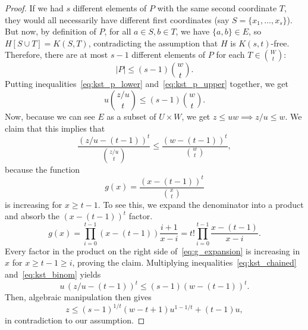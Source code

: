 \begin{theorem}
\begin{proof}
        If we had $s$ different elements of $P$ with the same second coordinate $T$,
        they would all necessarily have different first coordinates
        (say $S = \{x_1, \dots, x_s\}$).
        But now, by definition of $P$, for all $a \in S, b \in T$, we have $\{a, b\} \in E$,
        so $H[S \cup T] = K(S, T)$, contradicting the assumption that $H$ is $K(s, t)$-free.
        Therefore, there are at most $s - 1$ different elements of $P$ for each $T \in \binom{W}{t}$:
        \begin{equation} \label{eq:kst_p_upper}
            |P| \leq (s - 1) \binom{w}{t}.
        \end{equation}
        Putting inequalities~\eqref{eq:kst_p_lower} and~\eqref{eq:kst_p_upper}
        together, we get
        \begin{equation} \label{eq:kst_chained}
            u \binom{z / u}{t} \leq (s - 1) \binom{w}{t}.
        \end{equation}
        Now, because we can see $E$ as a subset of $U \times W$,
        we get $z \leq uw \implies z/u \leq w$.
        We claim that this implies that
        \begin{equation} \label{eq:kst_binom}
            \frac{(z/u - (t - 1))^t}{\binom{z/u}{t}} \leq \frac{(w - (t - 1))^t}{\binom{w}{t}},
        \end{equation}
        because the function
        \[
            g(x) = \frac{(x - (t - 1))^t}{\binom{x}{t}}
        \]
        is increasing for $x \geq t - 1$.
        To see this, we expand the denominator into a product and absorb the $(x - (t - 1))^t$ factor.
        \begin{equation} \label{eq:g_expansion}
            g(x) = \prod_{i=0}^{t-1} (x-(t-1)) \frac{i+1}{x-i} = t! \prod_{i=0}^{t-1} \frac{x-(t-1)}{x-i}.
        \end{equation}
        Every factor in the product on the right side of~\eqref{eq:g_expansion} is increasing
        in $x$ for $x \geq t - 1 \geq i$, proving the claim.
        Multiplying inequalities~\eqref{eq:kst_chained} and~\eqref{eq:kst_binom} yields
        \[
            u \, (z/u - (t - 1))^t \leq (s - 1)(w - (t - 1))^t.
        \]
        Then, algebraic manipulation then gives
        \[
            z \leq (s - 1)^{1 / t}(w - t + 1)u^{1 - 1 / t} + (t - 1)u,
        \]
        in contradiction to our assumption. \qedhere
    \end{proof}

\end{theorem}

